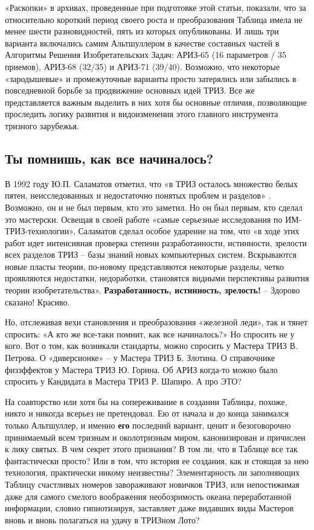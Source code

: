 \documentclass[11pt,a4paper]{article}
\begin{document}
«Раскопки» в архивах, проведенные при подготовке этой статьи, показали, что за
относительно короткий период своего роста и преобразования Таблица имела не
менее шести разновидностей, пять из которых опубликованы. И лишь три варианта
включались самим Альтшуллером в качестве составных частей в Алгоритмы Решения
Изобретательских Задач: АРИЗ-65 (16 параметров / 35 приемов), АРИЗ-68 (32/35)
и АРИЗ-71 (39/40). Возможно, что некоторые «зародышевые» и промежуточные
варианты просто затерялись или забылись в повседневной борьбе за продвижение
основных идей ТРИЗ. Все же представляется важным выделить в них хотя бы
основные отличия, позволяющие проследить логику развития и видоизменения этого
главного инструмента тризного зарубежья.

\subsection*{Ты помнишь, как все начиналось?}

В 1992 году Ю.П. Саламатов отметил, что «в ТРИЗ осталось множество белых
пятен, неисследованных и недостаточно понятых проблем и разделов»
\cite{Salamatov1992}. Возможно, он и не был первым, кто это заметил. Но он был
первым, кто сделал это мастерски. Освещая в своей работе «самые серьезные
исследования по ИМ-ТРИЗ-технологии», Саламатов сделал особое ударение на том,
что «в ходе этих работ идет интенсивная проверка степени разработанности,
истинности, зрелости всех разделов ТРИЗ -- базы знаний новых компьютерных
систем. Вскрываются новые пласты теории, по-новому представляются некоторые
разделы, четко проявляются недостатки, недоработки, становятся видными
перспективы развития теории изобретательства». \textbf{Разработанность,
  истинность, зрелость!} -- Здорово сказано!  Красиво.

Но, отслеживая вехи становления и преобразования «железной леди», так и тянет
спросить: «А кто же все-таки помнит, как все начиналось?» Но спросить не у
кого. Вот о том, как возникали стандарты, можно спросить у Мастера ТРИЗ
В. Петрова. О «диверсионке» -- у Мастера ТРИЗ Б. Злотина. О справочнике
физэффектов у Мастера ТРИЗ Ю. Горина. Об АРИЗ когда-то можно было спросить у
Кандидата в Мастера ТРИЗ Р. Шапиро. А про ЭТО?

На соавторство или хотя бы на сопереживание в создании Таблицы, похоже, никто
и никогда всерьез не претендовал. Ею от начала и до конца занимался только
Альтшуллер, и именно \textbf{его} последний вариант, ценит и безоговорочно
принимаемый всем тризным и околотризным миром, канонизирован и причислен к
лику святых. В чем секрет этого признания? В том ли, что в Таблице все так
фантастически просто? Или в том, что история ее создания, как и стоящая за нею
технология, практически никому неизвестны? Элементарность ли заполняющих
Таблицу счастливых номеров завораживают новичков ТРИЗ, или непостижимая даже
для самого смелого воображения необозримость океана переработанной информации,
словно гипнотизируя, заставляет даже видавших виды Мастеров вновь и вновь
полагаться на удачу в ТРИЗном Лото?
\end{document}
